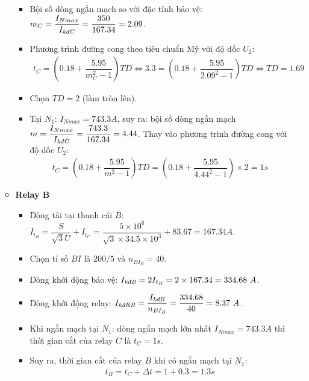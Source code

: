 \documentclass[12pt,a4paper]{article}
\begin{document}
\begin{enumerate}[1.]
\begin{itemize}
\begin{itemize}
							\item Bội số dòng ngắn mạch so với đặc tính bảo vệ: $m_C = \dfrac{I_{Nmax}}{I_{\text{\textit{kđC}}}} = \dfrac{350}{167.34} = 2.09$.
							
							\item Phương trình đường cong theo tiêu chuẩn Mỹ với độ dốc $U_2$:
								\begin{align*}
									t_C = \left({0.18 + \dfrac{5.95}{m_C^2 - 1}}\right)TD	\Longleftrightarrow 3.3 = \left({0.18 + \dfrac{5.95}{2.09^2 - 1}}\right)TD \Longleftrightarrow TD = 1.69
								\end{align*}	
							
							\item Chọn $TD = 2$ (làm tròn lên).
							
							\item Tại $N_1$: $I_{Nmax} =743.3 \unit{A}$, suy ra: bội số dòng ngắn mạch $m = \dfrac{I_{Nmax}}{I_{\text{\textit{kđC}}}} = \dfrac{743.3}{167.34} = 4.44$. Thay vào phương trình đường cong với độ dốc $U_2$:
								\begin{align*}
									t_C = \left({0.18 + \dfrac{5.95}{m^2 - 1}}\right)TD = \left({0.18 + \dfrac{5.95}{4.44^2 - 1}}\right) \times 2 = 1 \unit{s}
								\end{align*}								
						\end{itemize}
						
						\item \textbf{Relay B}
						\begin{itemize}
							\item Dòng tải tại thanh cái $B$: $I_{t_B} = \dfrac{S}{\sqrt{3} U} + I_{t_C}= \dfrac{5 \times 10^6}{\sqrt{3} \times 34.5 \times 10^3} + 83.67 = 167.34 \unit{A}$.
							
							\item Chọn tỉ số $BI$ là $200/5$ và $n_{BI_B} = 40$.
							
							\item Dòng khởi động bảo vệ: $I_{\text{\textit{kđB}}} = 2 I_{t_B} = 2 \times 167.34 = 334.68 ~A$.
							
							\item Dòng khởi động relay: $I_{\text{\textit{kđRB}}} = \dfrac{I_{\text{\textit{kđB}}}}{n_{BI_B}} = \dfrac{334.68}{40} = 8.37 ~A$.
							
							\item Khi ngắn mạch tại $N_1$: dòng ngắn mạch lớn nhất $I_{Nmax} = 743.3 \unit{A}$ thì thời gian cắt của relay $C$ là $t_C = 1 \unit{s}$.
							
							\item Suy ra, thời gian cắt của relay $B$ khi có ngắn mạch tại $N_1$:
								\begin{align*}
									t_B = t_{C} + \Delta t = 1 + 0.3 = 1.3 \unit{s}
								\end{align*}
								

\end{itemize}
\end{itemize}
\end{enumerate}
\end{document}
